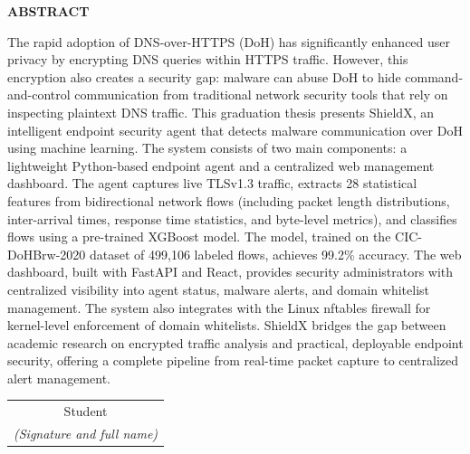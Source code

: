 \documentclass[../Main.tex]{subfiles}
\begin{document}
\begin{center}
    \Large{\textbf{ABSTRACT}}\\
\end{center}
\vspace{1cm}

The rapid adoption of DNS-over-HTTPS (DoH) has significantly enhanced user privacy by encrypting DNS queries within HTTPS traffic. However, this encryption also creates a security gap: malware can abuse DoH to hide command-and-control communication from traditional network security tools that rely on inspecting plaintext DNS traffic. This graduation thesis presents ShieldX, an intelligent endpoint security agent that detects malware communication over DoH using machine learning. The system consists of two main components: a lightweight Python-based endpoint agent and a centralized web management dashboard. The agent captures live TLSv1.3 traffic, extracts 28 statistical features from bidirectional network flows (including packet length distributions, inter-arrival times, response time statistics, and byte-level metrics), and classifies flows using a pre-trained XGBoost model. The model, trained on the CIC-DoHBrw-2020 dataset of 499,106 labeled flows, achieves 99.2\% accuracy. The web dashboard, built with FastAPI and React, provides security administrators with centralized visibility into agent status, malware alerts, and domain whitelist management. The system also integrates with the Linux nftables firewall for kernel-level enforcement of domain whitelists. ShieldX bridges the gap between academic research on encrypted traffic analysis and practical, deployable endpoint security, offering a complete pipeline from real-time packet capture to centralized alert management.

\begin{flushright}
\begin{tabular}{@{}c@{}}
Student\\
\textit{(Signature and full name)}
\end{tabular}
\end{flushright}
\end{document}
